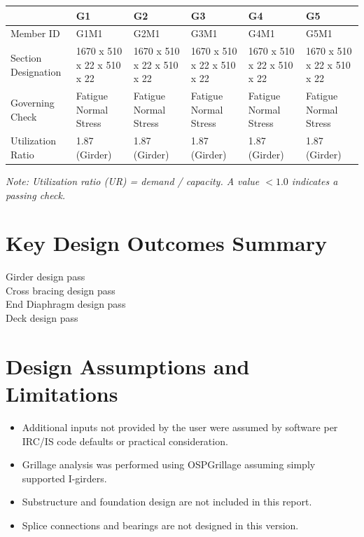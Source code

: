 \documentclass[12pt,a4paper]{report}
\numberwithin{table}{chapter}
\numberwithin{figure}{chapter}
\begin{document}
\vspace{0.4em}
\noindent
\begin{tabular}{|C{2.8cm}|C{2.4cm}|C{2.4cm}|C{2.4cm}|C{2.4cm}|C{2.4cm}|}
\hline
  \textbf{} &
  \textbf{G1} &
  \textbf{G2} &
  \textbf{G3} &
  \textbf{G4} &
  \textbf{G5} \\
\hline
Member ID & G1M1 & G2M1 & G3M1 & G4M1 & G5M1 \\
\hline
Section Designation & 1670 x 510 x 22 x 510 x 22 & 1670 x 510 x 22 x 510 x 22 & 1670 x 510 x 22 x 510 x 22 & 1670 x 510 x 22 x 510 x 22 & 1670 x 510 x 22 x 510 x 22 \\
\hline
Governing Check & Fatigue Normal Stress & Fatigue Normal Stress & Fatigue Normal Stress & Fatigue Normal Stress & Fatigue Normal Stress \\
\hline
Utilization Ratio & 1.87 (Girder) & 1.87 (Girder) & 1.87 (Girder) & 1.87 (Girder) & 1.87 (Girder) \\
\hline
\end{tabular}

\vspace{0.4em}
\noindent\textit{Note: Utilization ratio (UR) = demand / capacity. A value $< 1.0$ indicates a passing check.}

\vspace{1em}

\section*{Key Design Outcomes Summary}
\label{sec:key-outcomes}

\noindent Girder design pass \\
Cross bracing design pass \\
End Diaphragm design pass \\
Deck design pass

\section*{Design Assumptions and Limitations}
\label{sec:assumptions}

\begin{itemize}
\item Additional inputs not provided by the user were assumed by software per IRC/IS code defaults or practical consideration.
\item Grillage analysis was performed using OSPGrillage assuming simply supported I-girders.
\item Substructure and foundation design are not included in this report.
\item Splice connections and bearings are not designed in this version.
\end{itemize}
\end{document}

